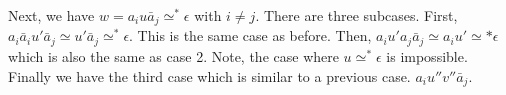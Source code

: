 \documentclass[12pt]{article}
\begin{document}
Next, we have $w=a_iu \bar a_j \simeq^* \epsilon$ with $i \neq j$. There are three subcases. First, $a_i \bar a_i u' \bar a_j \simeq u' \bar a_j \simeq^* \epsilon$. This is the same case as before. Then, $a_iu'a_j \bar a_j \simeq a_iu' \simeq* \epsilon$ which is also the same as case 2. Note, the case where $u \simeq^* \epsilon$ is impossible. Finally we have the third case which is similar to a previous case. $a_iu''v'' \bar a_j$. 
\end{document}
